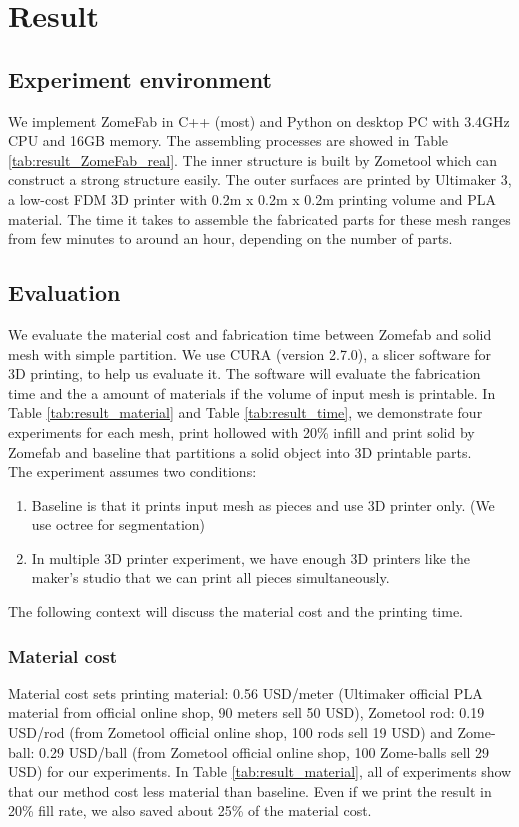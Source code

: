 \section{Result}
\label{sec:result}

\subsection{Experiment environment}
We implement ZomeFab in C++ (most) and Python on desktop PC with 3.4GHz CPU and 16GB memory. 
The assembling processes are showed in Table \ref{tab:result_ZomeFab_real}. The inner structure is built by Zometool which can construct a strong structure easily. 
The outer surfaces are printed by Ultimaker 3, a low-cost FDM 3{D} printer with 0.2m x 0.2m x 0.2m printing volume and PLA material. The time it takes to assemble the fabricated parts for these mesh ranges from few minutes to around an hour, depending on the number of parts.

\subsection{Evaluation}
We evaluate the material cost and fabrication time between Zomefab and solid mesh with simple partition. We use CURA (version 2.7.0), a slicer software for 3{D} printing, to help us evaluate it. The software will evaluate the fabrication time and the a amount of materials if the volume of input mesh is printable. In Table \ref{tab:result_material} and Table \ref{tab:result_time}, we demonstrate four experiments for each mesh, print hollowed with 20\% infill and print solid by Zomefab and baseline that partitions a solid object into 3D printable parts. \\
The experiment assumes two conditions: 
\begin{enumerate}
\item Baseline is that it prints input mesh as pieces and use 3D printer only. (We use octree for segmentation)
\item In multiple 3{D} printer experiment, we have enough  3D printers like the maker’s studio that we can print all pieces simultaneously. 
\end{enumerate}
The following context will discuss the material cost and the printing time.

\subsubsection{Material cost}
Material cost sets printing material: 0.56 USD/meter (Ultimaker official PLA material from official online shop, 90 meters sell 50 USD), Zometool rod: 0.19 USD/rod (from Zometool official online shop, 100 rods sell 19 USD) and Zome-ball: 0.29 USD/ball (from Zometool official online shop, 100 Zome-balls sell 29 USD) for our experiments. In Table \ref{tab:result_material}, all of experiments show that our method cost less material than baseline. Even if we print the result in 20\% fill rate, we also saved about 25\% of the material cost.

